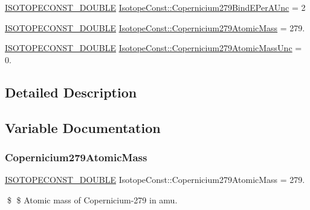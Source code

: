 \begin{DoxyCompactItemize}
\item 
\mbox{\hyperlink{group___isotope_const-_macros_ga8f45a7272ce02c0b4c65c44636ed719a}{I\+S\+O\+T\+O\+P\+E\+C\+O\+N\+S\+T\+\_\+\+D\+O\+U\+B\+LE}} \mbox{\hyperlink{group___isotope_const-_copernicium-_cn279_gae1fce1c164b1723924e07fc89c03e323}{Isotope\+Const\+::\+Copernicium279\+Bind\+E\+Per\+A\+Unc}} = 2
\item 
\mbox{\hyperlink{group___isotope_const-_macros_ga8f45a7272ce02c0b4c65c44636ed719a}{I\+S\+O\+T\+O\+P\+E\+C\+O\+N\+S\+T\+\_\+\+D\+O\+U\+B\+LE}} \mbox{\hyperlink{group___isotope_const-_copernicium-_cn279_gab6e8530190fbc1e734e46c850da432e1}{Isotope\+Const\+::\+Copernicium279\+Atomic\+Mass}} = 279.
\item 
\mbox{\hyperlink{group___isotope_const-_macros_ga8f45a7272ce02c0b4c65c44636ed719a}{I\+S\+O\+T\+O\+P\+E\+C\+O\+N\+S\+T\+\_\+\+D\+O\+U\+B\+LE}} \mbox{\hyperlink{group___isotope_const-_copernicium-_cn279_ga1ac7e451bab7898d30de5fe0261f6bb6}{Isotope\+Const\+::\+Copernicium279\+Atomic\+Mass\+Unc}} = 0.
\end{DoxyCompactItemize}


\subsection{Detailed Description}


\subsection{Variable Documentation}
\mbox{\label{group___isotope_const-_copernicium-_cn279_gab6e8530190fbc1e734e46c850da432e1}} 
\subsubsection{\texorpdfstring{Copernicium279\+Atomic\+Mass}{Copernicium279AtomicMass}}
{\footnotesize\ttfamily \mbox{\hyperlink{group___isotope_const-_macros_ga8f45a7272ce02c0b4c65c44636ed719a}{I\+S\+O\+T\+O\+P\+E\+C\+O\+N\+S\+T\+\_\+\+D\+O\+U\+B\+LE}} Isotope\+Const\+::\+Copernicium279\+Atomic\+Mass = 279.}

\$ \$ Atomic mass of Copernicium-\/279 in amu. \mbox{\label{group___isotope_const-_copernicium-_cn279_ga1ac7e451bab7898d30de5fe0261f6bb6}} 

